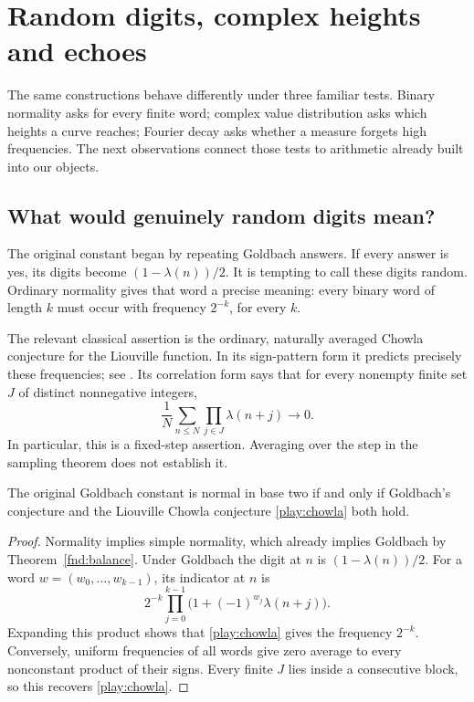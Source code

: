 \section{Random digits, complex heights and echoes}
\label{play:section}

The same constructions behave differently under three familiar tests.
Binary normality asks for every finite word; complex value distribution
asks which heights a curve reaches; Fourier decay asks whether a
measure forgets high frequencies.  The next observations connect those
tests to arithmetic already built into our objects.

\subsection{What would genuinely random digits mean?}

The original constant began by repeating Goldbach answers.  If every
answer is yes, its digits become $(1-\lambda(n))/2$.  It is tempting
to call these digits random.  Ordinary normality gives that word a
precise meaning: every binary word of length $k$ must occur with
frequency $2^{-k}$, for every $k$.

The relevant classical assertion is the ordinary, naturally averaged
Chowla conjecture for the Liouville function.  In its sign-pattern
form it predicts precisely these frequencies; see
\cite[Conjecture 1.3]{playMatomakiRadziwillTao2015}.  Its correlation
form says that for every nonempty finite set $J$ of distinct
nonnegative integers,
\begin{equation}
 \frac1N\sum_{n\le N}\prod_{j\in J}\lambda(n+j)
 \longrightarrow0.
 \label{play:chowla}
\end{equation}
In particular, this is a fixed-step assertion.  Averaging over the
step in the sampling theorem does not establish it.

\begin{proposition}\label{play:normality}
The original Goldbach constant is normal in base two if and only if
Goldbach's conjecture and the Liouville Chowla conjecture
\eqref{play:chowla} both hold.
\end{proposition}
\begin{proof}
Normality implies simple normality, which already implies Goldbach
by Theorem~\ref{fnd:balance}.  Under Goldbach the digit at $n$ is
$(1-\lambda(n))/2$.  For a word $w=(w_0,\ldots,w_{k-1})$, its
indicator at $n$ is
\[
 2^{-k}\prod_{j=0}^{k-1}
       \bigl(1+(-1)^{w_j}\lambda(n+j)\bigr).
\]
Expanding this product shows that \eqref{play:chowla} gives the
frequency $2^{-k}$.  Conversely, uniform frequencies of all words
give zero average to every nonconstant product of their signs.
Every finite $J$ lies inside a consecutive block, so this recovers
\eqref{play:chowla}.
\end{proof}

